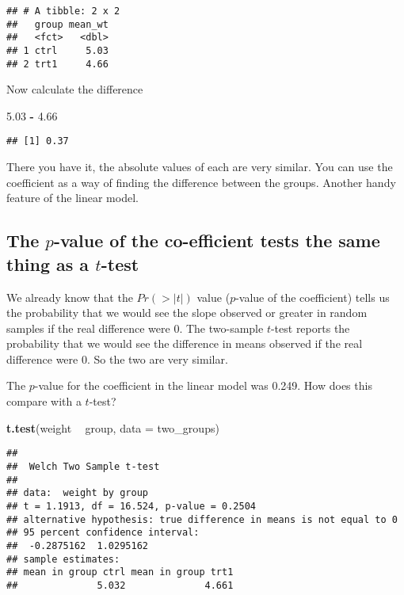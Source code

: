 \documentclass[]{book}
\newenvironment{Shaded}{\begin{snugshade}}{\end{snugshade}}
\newcommand{\DataTypeTok}[1]{\textcolor[rgb]{0.13,0.29,0.53}{#1}}
\newcommand{\FloatTok}[1]{\textcolor[rgb]{0.00,0.00,0.81}{#1}}
\newcommand{\KeywordTok}[1]{\textcolor[rgb]{0.13,0.29,0.53}{\textbf{#1}}}
\newcommand{\NormalTok}[1]{#1}
\newcommand{\OperatorTok}[1]{\textcolor[rgb]{0.81,0.36,0.00}{\textbf{#1}}}
\newcommand{\StringTok}[1]{\textcolor[rgb]{0.31,0.60,0.02}{#1}}
\begin{document}
\begin{verbatim}
## # A tibble: 2 x 2
##   group mean_wt
##   <fct>   <dbl>
## 1 ctrl     5.03
## 2 trt1     4.66
\end{verbatim}

Now calculate the difference

\begin{Shaded}
\begin{Highlighting}[]
\FloatTok{5.03} \OperatorTok{-}\StringTok{ }\FloatTok{4.66}
\end{Highlighting}
\end{Shaded}

\begin{verbatim}
## [1] 0.37
\end{verbatim}

There you have it, the absolute values of each are very similar. You can use the coefficient as a way of finding the difference between the groups. Another handy feature of the linear model.

\hypertarget{the-p-value-of-the-co-efficient-tests-the-same-thing-as-a-t-test}{%
\subsection{\texorpdfstring{The \(p\)-value of the co-efficient tests the same thing as a \(t\)-test}{The p-value of the co-efficient tests the same thing as a t-test}}\label{the-p-value-of-the-co-efficient-tests-the-same-thing-as-a-t-test}}

We already know that the \(Pr(>|t|)\) value (\(p\)-value of the coefficient) tells us the probability that we would see the slope observed or greater in random samples if the real difference were 0. The two-sample \(t\)-test reports the probability that we would see the difference in means observed if the real difference were 0. So the two are very similar.

The \(p\)-value for the coefficient in the linear model was 0.249. How does this compare with a \(t\)-test?

\begin{Shaded}
\begin{Highlighting}[]
\KeywordTok{t.test}\NormalTok{(weight }\OperatorTok{~}\StringTok{ }\NormalTok{group, }\DataTypeTok{data =}\NormalTok{ two_groups)}
\end{Highlighting}
\end{Shaded}

\begin{verbatim}
## 
##  Welch Two Sample t-test
## 
## data:  weight by group
## t = 1.1913, df = 16.524, p-value = 0.2504
## alternative hypothesis: true difference in means is not equal to 0
## 95 percent confidence interval:
##  -0.2875162  1.0295162
## sample estimates:
## mean in group ctrl mean in group trt1 
##              5.032              4.661
\end{verbatim}
\end{document}
